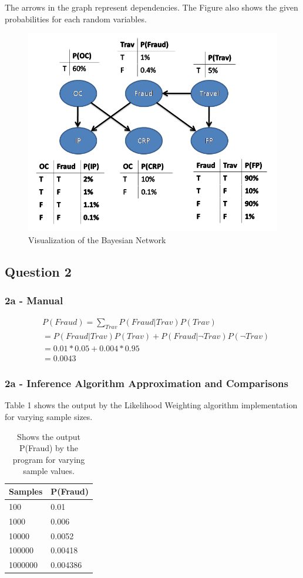 \documentclass[a4paper,11pt]{report}
\begin{document}
	The arrows in the graph represent dependencies. The Figure also shows the given probabilities for each random variables.
	\begin{figure}[h!]
	    \includegraphics[width=.7\textwidth]{images/partAgraph.png}
	  \caption{Visualization of the Bayesian Network}
	  \label{fig:visual}
	\end{figure}


	\subsection{Question 2}
		\subsubsection{2a - Manual}
			   \begin{align*}
			   &P(Fraud) = \displaystyle\sum\limits_{Trav} P(Fraud|Trav)P(Trav) \\
			   &= P(Fraud|Trav)P(Trav) + P(Fraud|\neg Trav)P(\neg Trav) \\
			   &= 0.01*0.05 + 0.004*0.95 \\
			   &= 0.0043
			   \end{align*}
		   
		 \subsubsection{2a - Inference Algorithm Approximation and Comparisons}
		 	Table 1 shows the output by the Likelihood Weighting algorithm implementation for varying sample sizes. 
		         \begin {table}[h]
			\begin{tabular*}{0.235\textwidth}[left]{|l|l|}
			\hline
			  Samples & \multicolumn{1}{|c|}{P(Fraud)} \\
			  \hline
			  100 & 0.01 \\
			  1000 & 0.006 \\
			  10000 & 0.0052  \\
			  100000 & 0.00418 \\
			  1000000 & 0.004386 \\
			  \hline
			\end{tabular*}
			    \caption{Shows the output P(Fraud) by the program for varying sample values.}
			\end{table}
		
\end{document}
